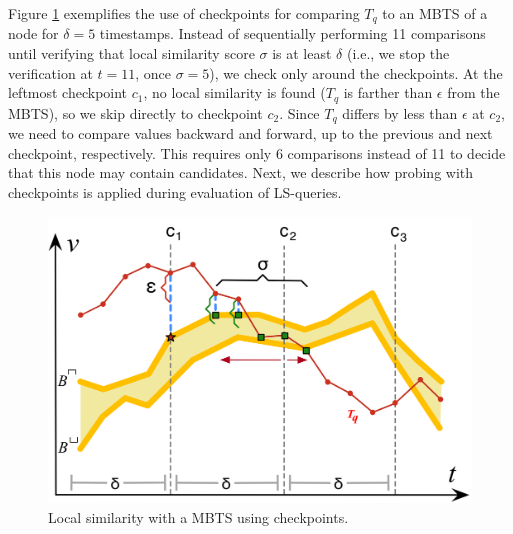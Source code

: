 






Figure \ref{fig:sim_mbts_checkpoints} exemplifies the use of checkpoints for comparing $T_q$ to an MBTS of a node for $\delta=5$ timestamps. Instead of sequentially performing 11 comparisons until verifying that local similarity score $\sigma$ is at least $\delta$ (i.e., we stop the verification at $t=11$, once $\sigma=5$), we check only around the checkpoints. At the leftmost checkpoint $c_1$, no local similarity is found ($T_q$ is farther than $\epsilon$ from the MBTS), so we skip directly to checkpoint $c_2$. Since $T_q$ differs by less than $\epsilon$ at $c_2$, we need to compare values backward and forward, up to the previous and next checkpoint, respectively. This requires only 6 comparisons instead of 11 to decide that this node may contain candidates. Next, we describe how probing with checkpoints is applied during evaluation of LS-queries.

\begin{figure}[tb]
    \centering
    \includegraphics{Figures/sim_mbts_checkpoints.png}
    \caption{Local similarity with a MBTS using checkpoints.}
    \label{fig:sim_mbts_checkpoints}
\end{figure}


